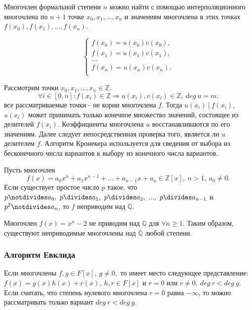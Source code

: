 \documentclass[12pt]{article}
\begin{document}
\begin{predp}
Многочлен формальной степени $n$ можно найти с помощью интерполяционного многочлена по $n + 1$ точке \mbox{$x_0, x_1, ..., x_{n}$} и значениям многочлена в этих точках \mbox{$f(x_0), f(x_1), ..., f(x_n)$.}
\end{predp}

$$\begin{cases}
f(x_0) = u(x_0)v(x_0), \\
f(x_1) = u(x_1)v(x_1), \\
... \\
f(x_n) = u(x_n)v(x_n). \\
\end{cases}$$

Рассмотрим точки $x_0, x_1, ..., x_{n} \in \mathbb{Z}$.
$$\forall i \in [0, n]: f(x_i) \in \mathbb{Z} \Rightarrow u(x_i), v(x_i) \in \mathbb{Z},~deg~u = m.$$
 все рассматриваемые точки - не корни многочлена $f$. Тогда $u(x_i)~|~f(x_i),$ $u(x_i)$ может принимать только конечное множество значений, состоящее из делителей $f(x_i)$. Коэффициенты многочлена $u$ восстанавливаются по его значениям. Далее следует непосредственная проверка того, является ли $u$ делителем $f$. Алгоритм Кронекера используется для сведения от выбора из бесконечного числа вариантов к выбору из конечного числа вариантов.  

\begin{thm}
Пусть многочлен $$f(x) = a_0x^n + a_1x^{n-1} + ... + a_{n-1}x + a_n \in \mathbb{Z}[x],~n > 1,~a_0 \neq 0.$$ Если существует простое число $p$ такое, что $p \notdivides a_0,~p \divides a_1,~p \divides a_2,~...,~p \divides a_{n - 1}$ и $p^2 \notdivides a_n$, то $f$ неприводим над $\mathbb{Q}$.
\end{thm}

\begin{examp}
Многочлен $f(x) = x^n - 2$ не приводим над $\mathbb{Q}$ для $\forall n \geq 1$. Таким образом, существуют неприводимые многочлены над $\mathbb{Q}$ любой степени.
\end{examp}

\subsubsection{Алгоритм Евклида}

\hspace{0.6cm}Если многочлены $f, g \in F[x],~g \neq 0,$ то имеет место следующее представление: \mbox{$f(x) = g(x)h(x) + r(x)$}$,~h, r \in F[x]$ и $r = 0$ или $r \neq 0,~deg~r < deg~g.$
Если считать, что степень нулевого многочлена $r = 0$ равна $-\infty$, то можно рассматривать только вариант $deg~r < deg~g$.
\end{document}
